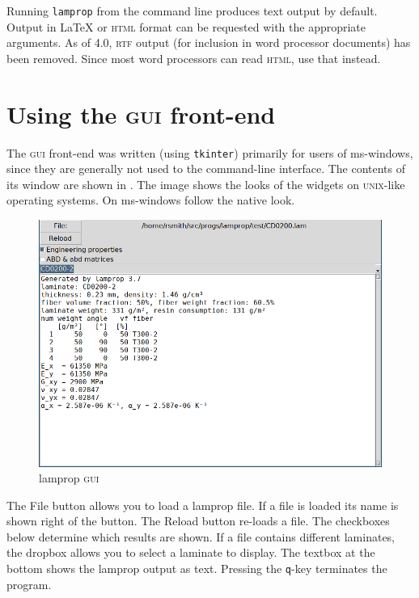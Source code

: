 \documentclass[a4paper,landscape,oneside,11pt,twocolumn]{memoir}
\begin{document}
Running \texttt{lamprop} from the command line produces text output by
default. Output in \LaTeX{} or \textsc{html} format can be requested with the
appropriate arguments. As of 4.0, \textsc{rtf} output (for inclusion in word
processor documents) has been removed. Since most word processors can read
\textsc{html}, use that instead.


\section{Using the \textsc{gui} front-end} %

The \textsc{gui} front-end was written (using \texttt{tkinter}) primarily for
users of ms-windows, since they are generally not used to the command-line
interface. The contents of its window are shown in . The
image shows the looks of the widgets on \textsc{unix}-like operating systems.
On ms-windows follow the native look.

\begin{figure}[!htbp]
  \centerline{\includegraphics[scale=1]{lamprop-gui.png}}
  \caption{\label{fig:lamprop-gui}lamprop \textsc{gui}}
\end{figure}

The \textsf{File} button allows you to load a lamprop file. If a file is
loaded its name is shown right of the button. The \textsf{Reload} button
re-loads a file. The checkboxes below determine which results are shown. If
a file contains different laminates, the dropbox allows you to select
a laminate to display. The textbox at the bottom shows the lamprop output as
text.
Pressing the \texttt{q}-key terminates the program.
\end{document}
